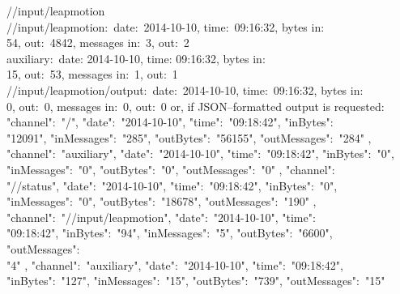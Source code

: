 /\serviceName/input/leapmotion\\
\settowidth{\utilLen}{/output}%
\hspace*{\utilLen}/\serviceName/input/leapmotion:\ \openSq{}date:\ 2014-10-10, time:\
09:16:32, bytes in:\ \\
\settowidth{\utilLen}{/xservicx/input/leapmotion/output: }%
\hspace*{\utilLen}54, out:\ 4842, messages in:\ 3, out:\ 2\closeSq\\
\settowidth{\utilLen}{/xservicx/input/leapmoti}%
\hspace*{\utilLen}auxiliary:\ \openSq{}date: 2014-10-10, time: 09:16:32, bytes in:\ \\
\settowidth{\utilLen}{/xservicx/input/leapmotion/output: }%
\hspace*{\utilLen}15, out:\ 53, messages in:\ 1, out:\ 1\closeSq\\
/\serviceName/input/leapmotion/output:\ \openSq{}date:\ 2014-10-10, time:\ 09:16:32, bytes
in:\ \\
\hspace*{\utilLen}0, out:\ 0, messages in:\ 0, out:\ 0\closeSq
\outputEnd{}
\newpage
or, if JSON--formatted output is requested:
\outputBegin{}
\openSq{} \openSq{} \textbraceleft{} "channel":\ "/\dollarService", "date":\
"2014-10-10", "time":\ "09:18:42", "inBytes":\ \\
"12091", "inMessages":\ "285", "outBytes":\ "56155", "outMessages":\ "284"
\textbraceright, \textbraceleft\\
"channel":\ "auxiliary", "date":\ "2014-10-10", "time":\ "09:18:42", "inBytes":\ "0",\\
"inMessages":\ "0", "outBytes":\ "0", "outMessages":\ "0" \textbraceright,
\textbraceleft{} "channel":\ \\
"/\dollarService/status", "date":\ "2014-10-10", "time":\ "09:18:42", "inBytes":\
"0",\\
"inMessages":\ "0", "outBytes":\ "18678", "outMessages":\ "190" \textbraceright{}
\closeSq,\\
\openSq{} \textbraceleft{} "channel":\ "/\serviceName/input/leapmotion", "date":\
"2014-10-10", "time":\ \\
"09:18:42", "inBytes":\ "94", "inMessages":\ "5", "outBytes":\ "6600", "outMessages":\ \\
"4" \textbraceright, \textbraceleft{} "channel":\ "auxiliary", "date":\ "2014-10-10",
"time":\ "09:18:42",\\
"inBytes":\ "127", "inMessages":\ "15", "outBytes":\ "739", "outMessages":\ "15"
